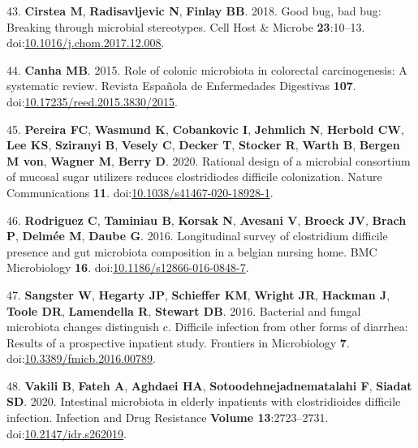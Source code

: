 \documentclass[
  11pt,
]{article}
\begin{document}
\leavevmode\hypertarget{ref-Cirstea2018}{}%
43. \textbf{Cirstea M}, \textbf{Radisavljevic N}, \textbf{Finlay BB}.
2018. Good bug, bad bug: Breaking through microbial stereotypes. Cell
Host \& Microbe \textbf{23}:10--13.
doi:\href{https://doi.org/10.1016/j.chom.2017.12.008}{10.1016/j.chom.2017.12.008}.

\leavevmode\hypertarget{ref-BorgesCanha2015}{}%
44. \textbf{Canha MB}. 2015. Role of colonic microbiota in colorectal
carcinogenesis: A systematic review. Revista Española de Enfermedades
Digestivas \textbf{107}.
doi:\href{https://doi.org/10.17235/reed.2015.3830/2015}{10.17235/reed.2015.3830/2015}.

\leavevmode\hypertarget{ref-Pereira2020}{}%
45. \textbf{Pereira FC}, \textbf{Wasmund K}, \textbf{Cobankovic I},
\textbf{Jehmlich N}, \textbf{Herbold CW}, \textbf{Lee KS},
\textbf{Sziranyi B}, \textbf{Vesely C}, \textbf{Decker T},
\textbf{Stocker R}, \textbf{Warth B}, \textbf{Bergen M von},
\textbf{Wagner M}, \textbf{Berry D}. 2020. Rational design of a
microbial consortium of mucosal sugar utilizers reduces clostridiodes
difficile colonization. Nature Communications \textbf{11}.
doi:\href{https://doi.org/10.1038/s41467-020-18928-1}{10.1038/s41467-020-18928-1}.

\leavevmode\hypertarget{ref-Rodriguez2016}{}%
46. \textbf{Rodriguez C}, \textbf{Taminiau B}, \textbf{Korsak N},
\textbf{Avesani V}, \textbf{Broeck JV}, \textbf{Brach P}, \textbf{Delmée
M}, \textbf{Daube G}. 2016. Longitudinal survey of clostridium difficile
presence and gut microbiota composition in a belgian nursing home. BMC
Microbiology \textbf{16}.
doi:\href{https://doi.org/10.1186/s12866-016-0848-7}{10.1186/s12866-016-0848-7}.

\leavevmode\hypertarget{ref-Sangster2016}{}%
47. \textbf{Sangster W}, \textbf{Hegarty JP}, \textbf{Schieffer KM},
\textbf{Wright JR}, \textbf{Hackman J}, \textbf{Toole DR},
\textbf{Lamendella R}, \textbf{Stewart DB}. 2016. Bacterial and fungal
microbiota changes distinguish c. Difficile infection from other forms
of diarrhea: Results of a prospective inpatient study. Frontiers in
Microbiology \textbf{7}.
doi:\href{https://doi.org/10.3389/fmicb.2016.00789}{10.3389/fmicb.2016.00789}.

\leavevmode\hypertarget{ref-Vakili2020a}{}%
48. \textbf{Vakili B}, \textbf{Fateh A}, \textbf{Aghdaei HA},
\textbf{Sotoodehnejadnematalahi F}, \textbf{Siadat SD}. 2020. Intestinal
microbiota in elderly inpatients with clostridioides difficile
infection. Infection and Drug Resistance \textbf{Volume 13}:2723--2731.
doi:\href{https://doi.org/10.2147/idr.s262019}{10.2147/idr.s262019}.
\end{document}
